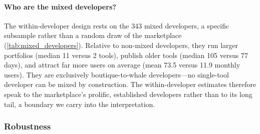 \paragraph{Who are the mixed developers?} The within-developer design rests on
the 343 mixed developers, a specific subsample rather than a random draw of the
marketplace (\autoref{tab:mixed_developers}). Relative to non-mixed developers,
they run larger portfolios (median 11 versus 2 tools), publish older tools
(median 105 versus 77 days), and attract far more users on average (mean 73.5
versus 11.9 monthly users). They are exclusively boutique-to-whale
developers---no single-tool developer can be mixed by construction. The
within-developer estimates therefore speak to the marketplace's prolific,
established developers rather than to its long tail, a boundary we carry into
the interpretation.



\subsubsection{Robustness}

